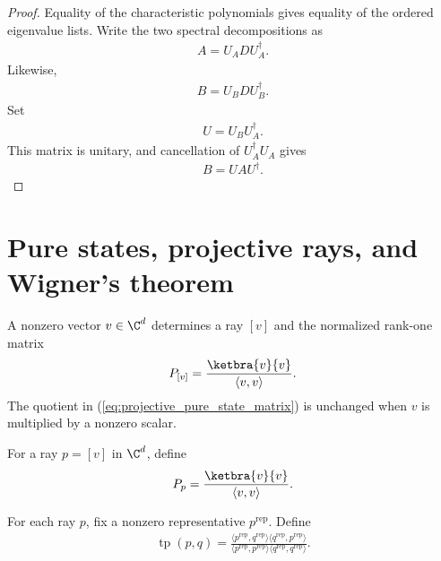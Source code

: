 \begin{proof}\leanok
    Equality of the characteristic polynomials gives equality of the ordered
    eigenvalue lists. Write the two spectral decompositions as
    \begin{align}
        A=U_A D U_A^\dagger.
    \end{align}
    Likewise,
    \begin{align}
        B=U_B D U_B^\dagger.
    \end{align}
    Set
    \begin{align}
        U=U_BU_A^\dagger.
    \end{align}
    This matrix is unitary, and cancellation of $U_A^\dagger U_A$ gives
    \begin{align}
        B=UAU^\dagger.
    \end{align}
\end{proof}

\section{Pure states, projective rays, and Wigner's theorem}

A nonzero vector $v\in\C^d$ determines a ray $[v]$ and the normalized
rank-one matrix
\begin{align}
    P_{[v]}=\frac{\ketbra{v}{v}}{\langle v,v\rangle}.
    \label{eq:projective_pure_state_matrix}
\end{align}
The quotient in (\ref{eq:projective_pure_state_matrix}) is unchanged when
$v$ is multiplied by a nonzero scalar.

\begin{definition}
    \label{def:projective_pure_state_matrix}
    \leanok
    For a ray $p=[v]$ in $\C^d$, define
    \begin{align}
        P_p=\frac{\ketbra{v}{v}}{\langle v,v\rangle}.
    \end{align}
\end{definition}

\begin{definition}
    \label{def:projective_transition_probability}
    \leanok
    For each ray $p$, fix a nonzero representative $p^{\mathrm{rep}}$. Define
    \begin{align}
        \operatorname{tp}(p,q)
        =\frac{\langle p^{\mathrm{rep}},q^{\mathrm{rep}}\rangle
          \langle q^{\mathrm{rep}},p^{\mathrm{rep}}\rangle}
        {\langle p^{\mathrm{rep}},p^{\mathrm{rep}}\rangle
          \langle q^{\mathrm{rep}},q^{\mathrm{rep}}\rangle}.
    \end{align}
\end{definition}

